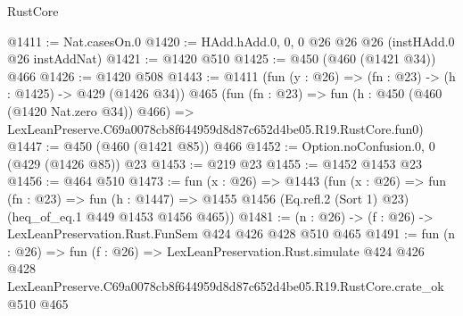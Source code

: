 \begin{lexlean}{RustCore}
\begin{coremodule}
@1411 := Nat.casesOn.{0}
@1420 := HAdd.hAdd.{0, 0, 0} @26 @26 @26 (instHAdd.{0} @26 instAddNat)
@1421 := @1420 @510
@1425 := @450 (@460 (@1421 @34)) @466
@1426 := @1420 @508
@1443 := @1411
    (fun (y : @26) => (fn : @23) -> (h : @1425) -> @429 (@1426 @34))
    @465
    (fun (fn : @23) =>
    fun (h : @450 (@460 (@1420 Nat.zero @34)) @466) =>
    LexLeanPreserve.C69a0078cb8f644959d8d87c652d4be05.R19.RustCore.fun0)
@1447 := @450 (@460 (@1421 @85)) @466
@1452 := Option.noConfusion.{0, 0} (@429 (@1426 @85)) @23
@1453 := @219 @23
@1455 := @1452 @1453 @23
@1456 := @464 @510
@1473 := fun (x : @26) =>
  @1443
    (fun (x : @26) =>
    fun (fn : @23) =>
    fun (h : @1447) => @1455 @1456 (Eq.refl.{2} (Sort 1) @23) (heq_of_eq.{1} @449 @1453 @1456 @465))
@1481 := (n : @26) -> (f : @26) -> LexLeanPreservation.Rust.FunSem @424 @426 @428 @510 @465
@1491 := fun (n : @26) =>
  fun (f : @26) =>
  LexLeanPreservation.Rust.simulate
    @424
    @426
    @428
    LexLeanPreserve.C69a0078cb8f644959d8d87c652d4be05.R19.RustCore.crate_ok
    @510
    @465
\end{coremodule}
\end{lexlean}
